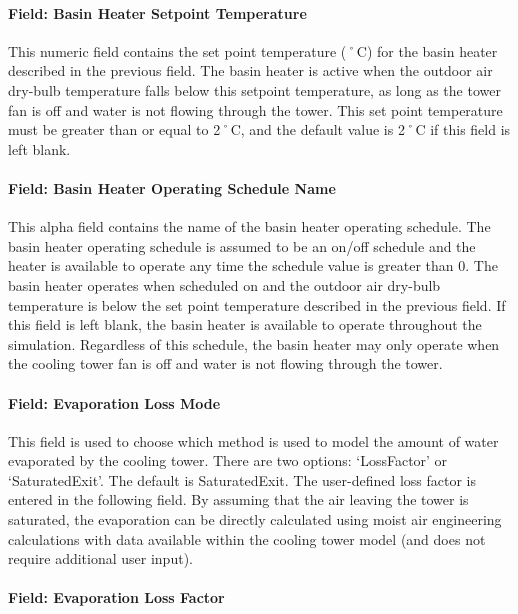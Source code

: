 \paragraph{Field: Basin Heater Setpoint Temperature}\label{field-basin-heater-setpoint-temperature-3}

This numeric field contains the set point temperature (˚C) for the basin heater described in the previous field. The basin heater is active when the outdoor air dry-bulb temperature falls below this setpoint temperature, as long as the tower fan is off and water is not flowing through the tower. This set point temperature must be greater than or equal to 2˚C, and the default value is 2˚C if this field is left blank.

\paragraph{Field: Basin Heater Operating Schedule Name}\label{field-basin-heater-operating-schedule-name-3}

This alpha field contains the name of the basin heater operating schedule. The basin heater operating schedule is assumed to be an on/off schedule and the heater is available to operate any time the schedule value is greater than 0. The basin heater operates when scheduled on and the outdoor air dry-bulb temperature is below the set point temperature described in the previous field. If this field is left blank, the basin heater is available to operate throughout the simulation. Regardless of this schedule, the basin heater may only operate when the cooling tower fan is off and water is not flowing through the tower.

\paragraph{Field: Evaporation Loss Mode}\label{field-evaporation-loss-mode-3}

This field is used to choose which method is used to model the amount of water evaporated by the cooling tower. There are two options: `LossFactor' or `SaturatedExit'. The default is SaturatedExit. The user-defined loss factor is entered in the following field. By assuming that the air leaving the tower is saturated, the evaporation can be directly calculated using moist air engineering calculations with data available within the cooling tower model (and does not require additional user input).

\paragraph{Field: Evaporation Loss Factor}\label{field-evaporation-loss-factor-3}


